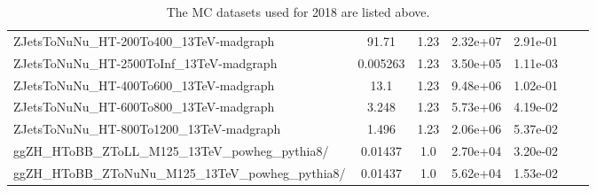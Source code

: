 \begin{table}
\begin{center}
{\begin{tabular}{|l|c|c|c|c|c|c|}
ZJetsToNuNu\_HT-200To400\_13TeV-madgraph & 91.71 & 1.23 & 2.32e+07 & 2.91e-01 \\
ZJetsToNuNu\_HT-2500ToInf\_13TeV-madgraph & 0.005263 & 1.23 & 3.50e+05 & 1.11e-03 \\
ZJetsToNuNu\_HT-400To600\_13TeV-madgraph & 13.1 & 1.23 & 9.48e+06 & 1.02e-01 \\
ZJetsToNuNu\_HT-600To800\_13TeV-madgraph & 3.248 & 1.23 & 5.73e+06 & 4.19e-02 \\
ZJetsToNuNu\_HT-800To1200\_13TeV-madgraph & 1.496 & 1.23 & 2.06e+06 & 5.37e-02 \\
ggZH\_HToBB\_ZToLL\_M125\_13TeV\_powheg\_pythia8/ & 0.01437 & 1.0 & 2.70e+04 & 3.20e-02 \\
ggZH\_HToBB\_ZToNuNu\_M125\_13TeV\_powheg\_pythia8/ & 0.01437 & 1.0 & 5.62e+04 & 1.53e-02 \\
 
\hline 
\end{tabular}} 
\end{center} 
\caption[2018 MC samples]{ 
  The MC datasets used for 2018 are listed above.
}
\label{tab:mc_2018} 
\end{table}
